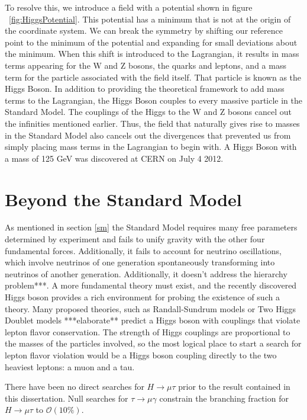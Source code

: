 \documentclass[oneside, letterpaper, oldfontcommands]{memoir}
\begin{document}
\qquad To resolve this, we introduce a field with a potential shown in figure ~\ref{fig:HiggsPotential}. This potential has a minimum that is not at the origin of the coordinate system. We can break the symmetry by shifting our reference point to the minimum of the potential and expanding for small deviations about the minimum. When this shift is introduced to the Lagrangian, it results in mass terms appearing for the W and Z bosons, the quarks and leptons, and a mass term for the particle associated with the field itself. That particle is known as the Higgs Boson. In addition to providing the theoretical framework to add mass terms to the Lagrangian, the Higgs Boson couples to every massive particle in the Standard Model. The couplings of the Higgs to the W and Z bosons cancel out the infinities mentioned earlier.\cite{Halzen:1984mc} Thus, the field that naturally gives rise to masses in the Standard Model also cancels out the divergences that prevented us from simply placing mass terms in the Lagrangian to begin with. A Higgs Boson with a mass of 125 GeV was discovered at CERN on July 4 2012. \cite{Agashe:2014kda}
 

\section{Beyond the Standard Model}\label{BSM}

\qquad As mentioned in section \ref{sm} the Standard Model requires many free parameters determined by experiment and fails to unify gravity with the other four fundamental forces. Additionally, it fails to account for neutrino oscillations\cite{Fukuda:1998mi}\cite{Ahmad:2001an}\cite{Ahmad:2002jz}, which involve neutrinos of one generation spontaneously transforming into neutrinos of another generation. Additionally, it doesn't address the hierarchy problem\cite{ArkaniHamed:1998rs}***. A more fundamental theory must exist, and the recently discovered Higgs boson provides a rich environment for probing the existence of such a theory. Many proposed theories, such as Randall-Sundrum models \cite{Randall:1999ee} or Two Higgs Doublet models \cite{Branco:2011iw} ***elaborate** predict a Higgs boson with couplings that violate lepton flavor conservation. The strength of Higgs couplings are proportional to the masses of the particles involved, so the most logical place to start a search for lepton flavor violation would be a Higgs boson coupling directly to the two heaviest leptons: a muon and a tau.

\qquad There have been no direct searches for $H \rightarrow \mu\tau$ prior to the result contained in this dissertation. Null searches for $\tau \rightarrow \mu\gamma$ constrain the branching fraction for $H \rightarrow \mu\tau$ to $\mathcal{O}(10\%)$.\cite{Harnik:2012pb}
\end{document}
